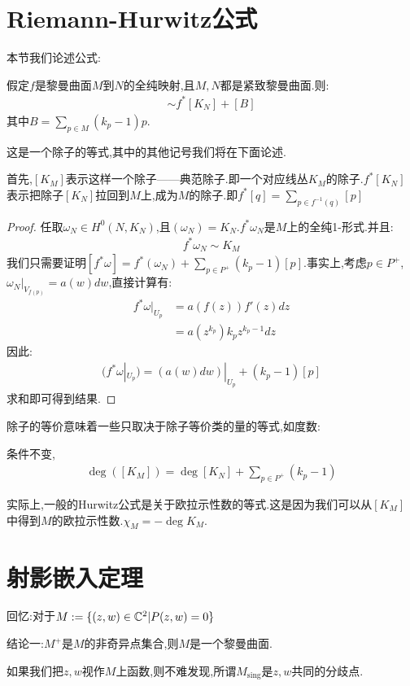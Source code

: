 \section{Riemann-Hurwitz公式}
本节我们论述公式:
\begin{theorem}
	假定$f$是黎曼曲面$M$到$N$的全纯映射,且$M,N$都是紧致黎曼曲面.则:
	\begin{align*}
		[K_M] \sim f^*[K_N]+[B]
	\end{align*}
	其中$B=\sum_{p \in M}(k_p-1)p$.

	这是一个除子的等式,其中的其他记号我们将在下面论述.
\end{theorem}
首先,$[K_M]$表示这样一个除子——典范除子.即一个对应线丛$K_M$的除子.$f^*[K_N]$表示把除子$[K_N]$拉回到$M$上,成为$M$的除子.即$f^*[q]=\sum_{p\in f^{-1}(q)}[p]$

\begin{proof}
	任取$\omega_N \in H^0(N,K_N)$,且$(\omega_N)=K_N$.$f^*\omega_N$是$M$上的全纯1-形式.并且:
	\begin{align*}
		f^*\omega_N \sim K_M
	\end{align*}
	我们只需要证明$[f^*\omega]=f^*(\omega_N)+\sum_{p\in P^+}(k_p-1)[p]$.事实上,考虑$p\in P^+$,$\omega_N|_{V_{f(p)}}=a(w)dw$,直接计算有:
	\begin{align*}
		f^*\omega|_{U_p}&=a(f(z))f'(z)dz\\&=a(z^{k_p})k_pz^{k_p-1}dz
	\end{align*}
	因此:
	\begin{align*}
		(f^*\omega|_{U_p})=(a(w)dw)|_{U_p}+(k_p-1)[p]
	\end{align*}
	求和即可得到结果.
\end{proof}
除子的等价意味着一些只取决于除子等价类的量的等式,如度数:
\begin{corollary}
	条件不变,
	\begin{align*}
		\deg ([K_M])=\deg [K_N]+\sum_{p \in P^+}(k_p-1)
	\end{align*}
\end{corollary}
实际上,一般的Hurwitz公式是关于欧拉示性数的等式.这是因为我们可以从$[K_M]$中得到$M$的欧拉示性数.$\chi_M=-\deg K_M$.

\section{射影嵌入定理}
回忆:对于$M:=\{(z,w)\in \mathbb{C}^2|P(z,w)=0\}$

结论一:$M^+$是$M$的非奇异点集合,则$M$是一个黎曼曲面.

如果我们把$z,w$视作$M$上函数,则不难发现,所谓$M_{\mathrm{sing}}$是$z,w$共同的分歧点.

